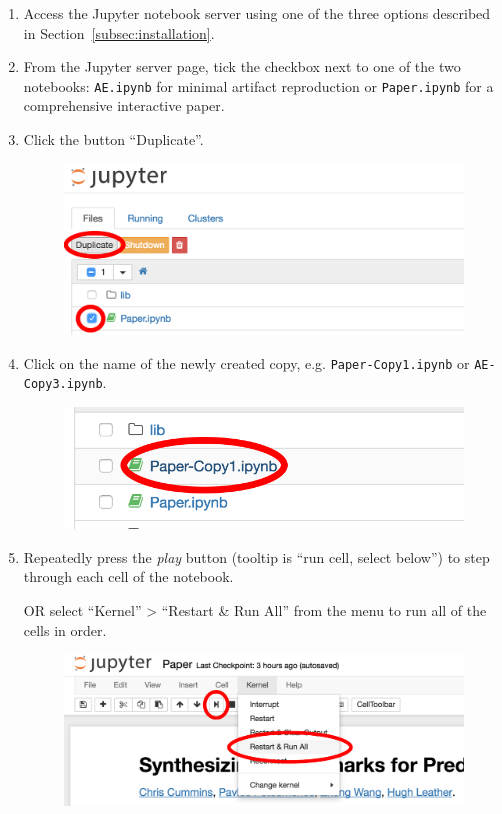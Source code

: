 \begin{enumerate}
\item Access the Jupyter notebook server using one of the three options described in Section~\ref{subsec:installation}.
\item From the Jupyter server page, tick the checkbox next to one of the two notebooks: \texttt{AE.ipynb} for minimal artifact reproduction or \texttt{Paper.ipynb} for a comprehensive interactive paper.
\item Click the button ``Duplicate''.
\begin{figure}[H]
\includegraphics[width=\columnwidth]{img/notebook}
\end{figure}
\item Click on the name of the newly created copy, e.g. \texttt{Paper-Copy1.ipynb} or \texttt{AE-Copy3.ipynb}.
\begin{figure}[H]
\includegraphics[width=\columnwidth]{img/notebook-copy}
\end{figure}
\item Repeatedly press the \emph{play} button (tooltip is ``run cell, select below'') to step through each cell of the notebook.

OR select ``Kernel'' > ``Restart \& Run All'' from the menu to run all of the cells in order.
\begin{figure}[H]
\includegraphics[width=\columnwidth]{img/jupyter}
\end{figure}
\end{enumerate}


